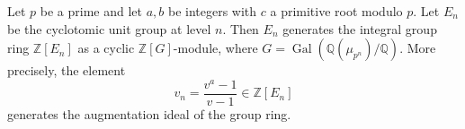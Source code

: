 Let $p$ be a prime and let $a, b$ be integers with $c$ a primitive root modulo $p$. Let $E_n$ be the cyclotomic unit group at level $n$. Then $E_n$ generates the integral group ring $\mathbb{Z}[E_n]$ as a cyclic $\mathbb{Z}[G]$-module, where $G = \operatorname{Gal}(\mathbb{Q}(\mu_{p^n})/\mathbb{Q})$. More precisely, the element
$$
v_n = \frac{v^a - 1}{v - 1} \in \mathbb{Z}[E_n]
$$
generates the augmentation ideal of the group ring.
